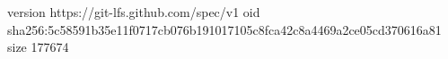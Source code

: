 version https://git-lfs.github.com/spec/v1
oid sha256:5c58591b35e11f0717cb076b191017105c8fca42c8a4469a2ce05cd370616a81
size 177674
